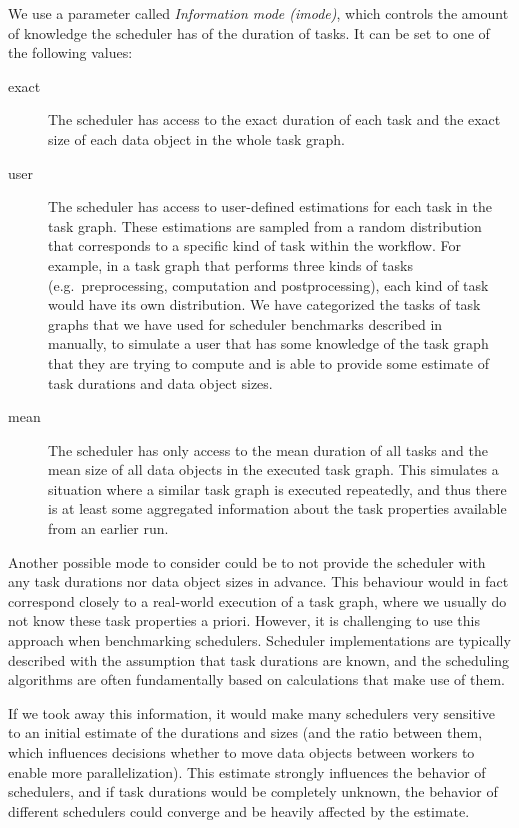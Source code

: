 \begin{description}[wide=0pt]
		We use a parameter called \emph{Information mode (imode)}, which controls the amount of knowledge the
		scheduler has of the duration of tasks. It can be set to one of the following values:
		\begin{description}
			\item[exact] The scheduler has access to the exact duration of each task and the exact size of each data object
				in the whole task graph.
			\item[user] The scheduler has access to user-defined estimations for each task in the task graph. These
				estimations are sampled from a random distribution that corresponds to a specific kind of task
				within the workflow. For example, in a task graph that performs three kinds of tasks (e.g.\
				preprocessing, computation and postprocessing), each kind of task would have its own distribution.
				We have categorized the tasks of task graphs that we have used for scheduler benchmarks described
				in~\Autoref{sec:estee-benchmarks} manually, to simulate a user that has some knowledge of the task graph
				that they are trying to compute and is able to provide some estimate of task durations and data
				object sizes.
			\item[mean] The scheduler has only access to the mean duration of all tasks and the mean size of all data
				objects in the executed task graph. This simulates a situation where a similar task graph is
				executed repeatedly, and thus there is at least some aggregated information about the task
				properties available from an earlier run.
		\end{description}
		Another possible mode to consider could be to not provide the scheduler with any task durations nor
		data object sizes in advance. This behaviour would in fact correspond closely to a real-world
		execution of a task graph, where we usually do not know these task properties a priori. However, it
		is challenging to use this approach when benchmarking schedulers. Scheduler implementations are
		typically described with the assumption that task durations are known, and the scheduling
		algorithms are often fundamentally based on calculations that make use of them.

		If we took away this information, it would make many schedulers very sensitive to an initial
		estimate of the durations and sizes (and the ratio between them, which influences decisions whether
		to move data objects between workers to enable more parallelization). This estimate strongly
		influences the behavior of schedulers, and if task durations would be completely unknown, the
		behavior of different schedulers could converge and be heavily affected by the estimate.


\end{description}
